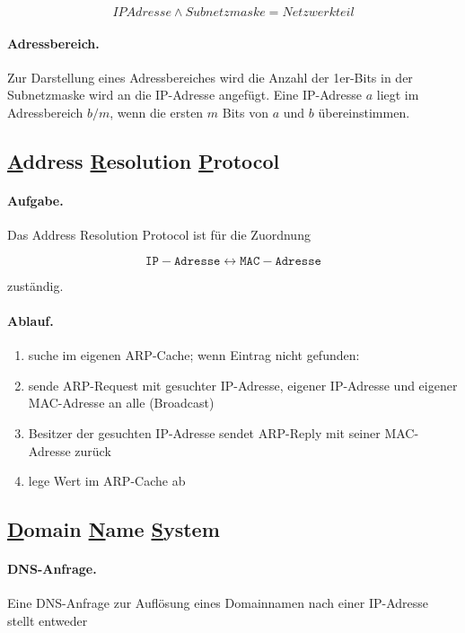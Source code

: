 \documentclass[]{scrartcl}
\begin{document}
$$IPAdresse \wedge Subnetzmaske = Netzwerkteil$$

\paragraph{Adressbereich.}Zur Darstellung eines Adressbereiches wird die Anzahl der 1er-Bits in der Subnetzmaske wird an die IP-Adresse angef\"ugt. Eine IP-Adresse $a$ liegt im Adressbereich $b/m$, wenn die ersten $m$ Bits von $a$ und $b$ \"ubereinstimmen.


\subsection{\underline{A}ddress \underline{R}esolution \underline{P}rotocol} 

\paragraph{Aufgabe.}Das Address Resolution Protocol ist f\"ur die Zuordnung

$$\mathtt{IP-Adresse} \leftrightarrow \mathtt{MAC-Adresse}$$

zust\"andig.

\paragraph{Ablauf.}
\begin{enumerate}
\item suche im eigenen ARP-Cache; wenn Eintrag nicht gefunden:
\item sende ARP-Request mit gesuchter IP-Adresse, eigener IP-Adresse und eigener MAC-Adresse an alle (Broadcast)
\item Besitzer der gesuchten IP-Adresse sendet ARP-Reply mit seiner MAC-Adresse zur\"uck
\item lege Wert im ARP-Cache ab
\end{enumerate}


\subsection{\underline{D}omain \underline{N}ame \underline{S}ystem}

\paragraph{DNS-Anfrage.} Eine DNS-Anfrage zur Aufl\"osung eines Domainnamen nach einer IP-Adresse stellt entweder
\end{document}
